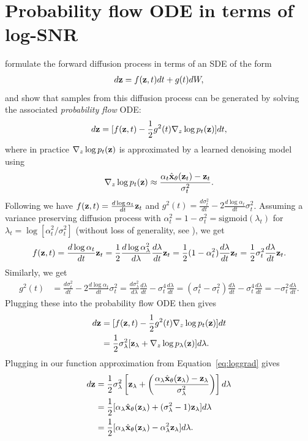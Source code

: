 \documentclass[hidelinks]{article} %
\begin{document}
\section{Probability flow ODE in terms of log-SNR}
\label{app:snr_ode}
\cite{song2020score} formulate the forward diffusion process in terms of an SDE of the form
\begin{align}
d{\mathbf{z}} = f({\mathbf{z}}, t)dt + g(t)dW,
\end{align}
and show that samples from this diffusion process can be generated by solving the associated \emph{probability flow} ODE:
\begin{align}
d{\mathbf{z}} = [f({\mathbf{z}}, t) - \frac{1}{2}g^{2}(t)\nabla_{z}\log p_{t}({\mathbf{z}}) ]dt,
\end{align}
where in practice $\nabla_{z}\log p_{t}({\mathbf{z}})$ is approximated by a learned denoising model using
\begin{align}
\label{eq:loggrad}
\nabla_{z}\log p_{t}({\mathbf{z}}) \approx \frac{\alpha_{t}\hat{{\mathbf{x}}}_{\theta}({\mathbf{z}}_t) - {\mathbf{z}}_t}{\sigma^{2}_t}.
\end{align}
Following \cite{kingma2021variational} we have $f({\mathbf{z}}, t) = \frac{d \log\alpha_t}{dt}{\mathbf{z}}_t$ and $g^2(t) = \frac{d\sigma^{2}_t}{dt} - 2\frac{d \log\alpha_t}{dt}\sigma^{2}_t$. Assuming a variance preserving diffusion process with $\alpha^{2}_t = 1 - \sigma^{2}_t = \text{sigmoid}(\lambda_t)$ for $\lambda_t = \log[\alpha^{2}_t/\sigma^{2}_t]$ (without loss of generality, see \cite{kingma2021variational}), we get 
\begin{align}
f({\mathbf{z}}, t) = \frac{d \log\alpha_t}{dt}{\mathbf{z}}_t = \frac{1}{2}\frac{d \log\alpha^2_\lambda}{d\lambda}\frac{d\lambda}{dt}{\mathbf{z}}_t = \frac{1}{2}(1 - \alpha^{2}_t)\frac{d\lambda}{dt}{\mathbf{z}}_t = \frac{1}{2}\sigma^{2}_t\frac{d\lambda}{dt}{\mathbf{z}}_t.
\end{align}
Similarly, we get
\begin{align}
g^2(t) &= \frac{d\sigma^{2}_t}{dt} - 2\frac{d \log\alpha_t}{dt}\sigma^{2}_t = \frac{d\sigma^{2}_\lambda}{d\lambda}\frac{d\lambda}{dt} - \sigma^{4}_t\frac{d\lambda}{dt} = (\sigma^{4}_t - \sigma^{2}_t)\frac{d\lambda}{dt} - \sigma^{4}_t\frac{d\lambda}{dt} = -\sigma^{2}_t\frac{d\lambda}{dt}.
\end{align}
Plugging these into the probability flow ODE then gives
\begin{align}
d{\mathbf{z}} &= [f({\mathbf{z}}, t) - \frac{1}{2}g^{2}(t)\nabla_{z}\log p_{t}({\mathbf{z}}) ]dt\\
&= \frac{1}{2}\sigma^{2}_\lambda[{\mathbf{z}}_\lambda + \nabla_{z}\log p_{\lambda}({\mathbf{z}}) ]d\lambda.
\end{align}
Plugging in our function approximation from Equation~\ref{eq:loggrad} gives
\begin{align}
d{\mathbf{z}} &= \frac{1}{2}\sigma^{2}_\lambda\left[{\mathbf{z}}_\lambda + \left(\frac{\alpha_{\lambda}\hat{{\mathbf{x}}}_{\theta}({\mathbf{z}}_\lambda) - {\mathbf{z}}_\lambda}{\sigma^{2}_\lambda}\right)\right]d\lambda\\
&= \frac{1}{2}[\alpha_{\lambda}\hat{{\mathbf{x}}}_{\theta}({\mathbf{z}}_\lambda) + (\sigma^{2}_\lambda - 1){\mathbf{z}}_\lambda]d\lambda\\
&= \frac{1}{2}[\alpha_{\lambda}\hat{{\mathbf{x}}}_{\theta}({\mathbf{z}}_\lambda)-\alpha^{2}_\lambda{\mathbf{z}}_\lambda]d\lambda. \label{eq:logsnr_flow}
\end{align}
\end{document}
